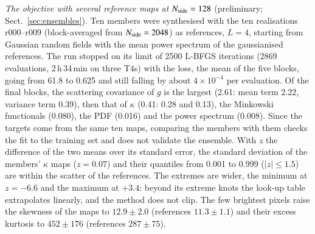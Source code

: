 \documentclass{aa}
\newcommand{\nside}{N_{\rm side}}
\begin{document}
\emph{The objective with several reference maps at $\nside=128$} (preliminary; Sect.~\ref{sec:ensembles}). Ten members were synthesised with the ten realisations r000--r009 (block-averaged from $\nside=2048$) as references, $L=4$, starting from Gaussian random fields with the mean power spectrum of the gaussianised references. The run stopped on its limit of 2500 L-BFGS iterations (2869 evaluations, 2\,h\,34\,min on three T4s) with the loss, the mean of the five blocks, going from 61.8 to 0.625 and still falling by about $4\times10^{-4}$ per evaluation. Of the final blocks, the scattering covariance of $g$ is the largest (2.61: mean term 2.22, variance term 0.39), then that of $\kappa$ (0.41: 0.28 and 0.13), the Minkowski functionals (0.080), the PDF (0.016) and the power spectrum (0.008). Since the targets come from the same ten maps, comparing the members with them checks the fit to the training set and does not validate the ensemble. With $z$ the difference of the two means over its standard error, the standard deviation of the members' $\kappa$ maps ($z=0.07$) and their quantiles from 0.001 to 0.999 ($|z|\leq1.5$) are within the scatter of the references. The extremes are wider, the minimum at $z=-6.6$ and the maximum at $+3.4$: beyond its extreme knots the look-up table extrapolates linearly, and the method does not clip. The few brightest pixels raise the skewness of the maps to $12.9\pm2.0$ (references $11.3\pm1.1$) and their excess kurtosis to $452\pm176$ (references $287\pm75$).
\end{document}
